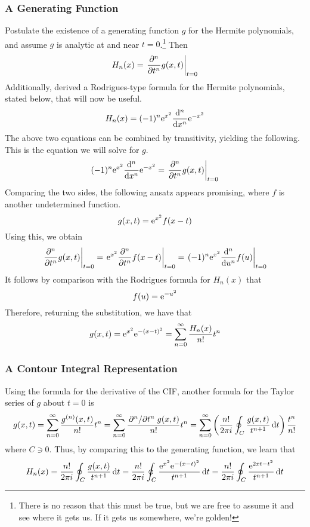 \documentclass[titlepage]{article}
\numberwithin{equation}{section}
\begin{document}
\subsubsection{A Generating Function}
Postulate the existence of a generating function $g$ for the Hermite polynomials, and assume $g$ is analytic at and near $t=0$.\footnote{There is no reason that this must be true, but we are free to assume it and see where it gets us. If it gets us somewhere, we're golden!} Then
\begin{equation*}
    H_n(x) = \eval{\pdv[n]{t}g(x,t)}_{t=0}
\end{equation*}
Additionally, \textcite{bib:Seaborn} derived a Rodrigues-type formula for the Hermite polynomials, stated below, that will now be useful.
\begin{equation*}
    H_n(x) = (-1)^n\e[x^2]\dv[n]{x}\e[-x^2]
\end{equation*}
The above two equations can be combined by transitivity, yielding the following. This is the equation we will solve for $g$.
\begin{equation*}
    (-1)^n\e[x^2]\dv[n]{x}\e[-x^2] = \eval{\pdv[n]{t}g(x,t)}_{t=0}
\end{equation*}
Comparing the two sides, the following ansatz appears promising, where $f$ is another undetermined function.
\begin{equation*}
    g(x,t) = \e[x^2]f(x-t)
\end{equation*}
Using this, we obtain
\begin{equation*}
    \eval{\pdv[n]{t}g(x,t)}_{t=0} = \eval{\e[x^2]\pdv[n]{t}f(x-t)}_{t=0}
    = \eval{(-1)^n\e[x^2]\dv[n]{u}f(u)}_{t=0}
\end{equation*}
It follows by comparison with the Rodrigues formula for $H_n(x)$ that
\begin{equation*}
    f(u) = \e[-u^2]
\end{equation*}
Therefore, returning the substitution, we have that
\begin{equation*}
    g(x,t) = \e[x^2]\e[-(x-t)^2] = \sum_{n=0}^\infty\frac{H_n(x)}{n!}t^n
\end{equation*}

\subsubsection{A Contour Integral Representation}
Using the formula for the derivative of the CIF, another formula for the Taylor series of $g$ about $t=0$ is
\begin{equation*}
    g(x,t) = \sum_{n=0}^\infty\frac{g^{(n)}(x,t)}{n!}t^n
    = \sum_{n=0}^\infty\frac{\pdv*[n]{t}g(x,t)}{n!}t^n
    = \sum_{n=0}^\infty\left( \frac{n!}{2\pi i}\oint_C\frac{g(x,t)}{t^{n+1}}\dd{t} \right)\frac{t^n}{n!}
\end{equation*}
where $C\ni 0$. Thus, by comparing this to the generating function, we learn that
\begin{equation*}
    H_n(x) = \frac{n!}{2\pi i}\oint_C\frac{g(x,t)}{t^{n+1}}\dd{t}
    = \frac{n!}{2\pi i}\oint_C\frac{\e[x^2]\e[-(x-t)^2]}{t^{n+1}}\dd{t}
    = \frac{n!}{2\pi i}\oint_C\frac{\e[2xt-t^2]}{t^{n+1}}\dd{t}
\end{equation*}
\end{document}
